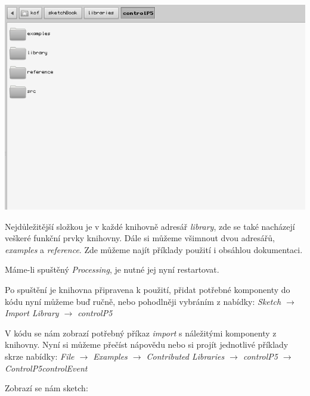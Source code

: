 \documentclass[10pt,twoside=true,open=right,cleardoublepage=empty,chapterprefix=true]{scrbook}
\newcommand{\vyraz}[1]{\textit{\gls{#1}}\index{#1}\label{#1}}
\begin{document}
\begin{center}
\includegraphics[width = 1\textwidth]{imgs/controlp52.png}
\end{center}

\newpage

Nejdůležitější složkou je v každé knihovně adresář {\em library}, zde se také nacházejí veškeré funkční prvky knihovny. Dále si můžeme všimnout dvou adresářů, {\em examples} a {\em reference}. Zde můžeme najít příklady použití i obsáhlou dokumentaci.

Máme-li spuštěný {\em Processing}, je nutné jej nyní restartovat.

Po spuštění je knihovna připravena k použití, přidat potřebné komponenty do kódu nyní můžeme buď ručně, nebo pohodlněji vybráním z nabídky: {\em Sketch $\rightarrow$ Import Library $\rightarrow$ controlP5}

V kódu se nám zobrazí potřebný příkaz \vyraz{import} s náležitými komponenty z knihovny. Nyní si můžeme přečíst nápovědu nebo si projít jednotlivé příklady skrze nabídky: {\em File $\rightarrow$ Examples $\rightarrow$ Contributed Libraries $\rightarrow$ controlP5 $\rightarrow$ ControlP5controlEvent}

Zobrazí se nám sketch:
\end{document}
